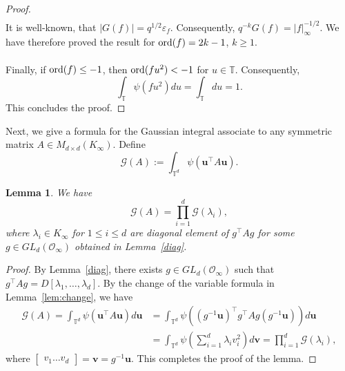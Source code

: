 \documentclass[11pt]{amsart}
\theoremstyle{plain}
\theoremstyle{plain}
\newtheorem{lemma}[theorem]{Lemma}
\renewcommand{\vec}[1]{\mathbf{#1}}
\theoremstyle{remark}
\theoremstyle{definition}
\newcommand{\ord}{\textup{ord}}
\newcommand{\TT}{\mathbb{T}}
\newcommand{\cO}{\mathcal{O}}
\newcommand{\cG}{\mathcal{G}}
\begin{document}
\begin{proof}
\begin{eqnarray*}
\end{eqnarray*}
It is well-known,  that $|G(f)|=q^{1/2}\varepsilon_f$. Consequently, $q^{-k}G(f)=|f|_{\infty}^{-1/2}$. We have therefore proved the result for $\ord(f)=2k-1$, $k\geq 1$. \\
\\
Finally, if $\ord(f)\leq -1$, then $\ord (fu^2)<-1$ for $u\in\mathbb{T}$. Consequently,
\[\int_{\TT}\psi(fu^2)du=\int_{\TT}du=1.\] 
This concludes the proof.
\end{proof}
Next, we give a formula for the Gaussian integral associate to any symmetric matrix $A \in M_{d\times d}(K_{\infty}).$ Define
\[
\cG(A):=\int_{\TT^d}\psi(\vec{u}^{\intercal}A\vec{u}).
\]

\begin{lemma}\label{gauint}
We have 
\[
\cG(A)=\prod_{i=1}^d \cG(\lambda_i),
\]
where $\lambda_i \in K_{\infty}$ for $1 \leq i\leq d$ are diagonal element of $g^{\intercal}Ag$ for some $g\in GL_d(\cO_{\infty})$ obtained in Lemma~\ref{diag}. \end{lemma}
\begin{proof}
By Lemma~\ref{diag}, there exists $g\in GL_d(\cO_{\infty}) $ such that $g^{\intercal}Ag=D[\lambda_1,\dots,\lambda_d].$  By the change of the variable formula in Lemma~\ref{lem:change}, we have 
\begin{equation*}
\begin{split}
\cG(A)=\int_{\TT^d}\psi(\vec{u}^{\intercal}A\vec{u}) d\vec{u}&=\int_{\TT^d}\psi\left((g^{-1}\vec{u} )^{\intercal} g^{\intercal}Ag (g^{-1}\vec{u})\right) d\vec{u}
\\
&=\int_{\TT^d}\psi\left( \sum_{i=1}^d \lambda_i v_i^2 \right) d\vec{v}=\prod_{i=1}^d \cG(\lambda_i),
\end{split}
\end{equation*}
where $\begin{bmatrix}v_1 \hdots v_d \end{bmatrix}=\vec{v}=g^{-1}\vec{u}.$ This completes the proof of the lemma. 
\end{proof}
\end{document}
